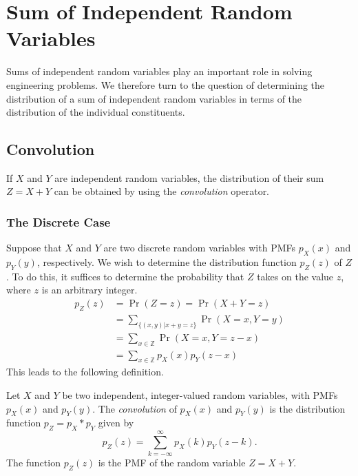 \chapter{Sum of Independent Random Variables}

Sums of independent random variables play an important role in solving engineering problems.
We therefore turn to the question of determining the distribution of a sum of independent random variables in terms of the distribution of the individual constituents.

\section{Convolution}

If $X$ and $Y$ are independent random variables, the distribution of their sum $Z = X + Y$ can be obtained by using the \emph{convolution} operator.

\subsection{The Discrete Case}

Suppose that $X$ and $Y$ are two discrete random variables with PMFs $p_X(x)$ and $p_Y(y)$, respectively.
We wish to determine the distribution function $p_Z (z)$ of $Z$.
To do this, it suffices to determine the probability that $Z$ takes on the value $z$, where $z$ is an arbitrary integer.
\begin{equation*}
\begin{split}
p_Z (z) &= \Pr (Z = z) = \Pr (X + Y = z) \\
&= \sum_{ \{ (x,y) | x + y = z \} } \Pr (X = x, Y = y) \\
&= \sum_{ x \in \mathbb{Z} } \Pr (X = x, Y = z-x) \\
&= \sum_{ x \in \mathbb{Z} } p_X (x) p_Y(z-x)
\end{split}
\end{equation*}
This leads to the following definition.

\begin{definition} \label{definition:DiscreteConvolution}
Let $X$ and $Y$ be two independent, integer-valued random variables, with PMFs $p_X(x)$ and $p_Y(y)$.
The \emph{convolution} of $p_X(x)$ and $p_Y(y)$ is the distribution function $p_Z = p_X * p_Y$ given by
\begin{equation*}
p_Z(z) = \sum_{k = - \infty}^{\infty} p_X(k) p_Y(z-k) .
\end{equation*}
The function $p_Z(z)$ is the PMF of the random variable $Z = X + Y$.
\end{definition}

